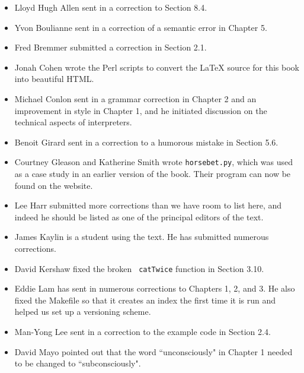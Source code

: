 \begin{itemize}

\small
\item Lloyd Hugh Allen sent in a correction to Section 8.4.

\item Yvon Boulianne sent in a correction of a semantic error in
Chapter 5.

\item Fred Bremmer submitted a correction in Section 2.1.

\item Jonah Cohen wrote the Perl scripts to convert the
LaTeX source for this book into beautiful HTML.

\item Michael Conlon sent in a grammar correction in Chapter 2
and an improvement in style in Chapter 1, and he initiated discussion
on the technical aspects of interpreters.

\item Benoit Girard sent in a
correction to a humorous mistake in Section 5.6.

\item Courtney Gleason and Katherine Smith wrote \texttt{horsebet.py},
which was used as a case study in an earlier version of the book.  Their
program can now be found on the website.

\item Lee Harr submitted more corrections than we have room to list
here, and indeed he should be listed as one of the principal editors
of the text.

\item James Kaylin is a student using the text. He has submitted
numerous corrections.

\item David Kershaw fixed the broken \texttt{ catTwice} function in Section
3.10.

\item Eddie Lam has sent in numerous corrections to Chapters 
1, 2, and 3.
He also fixed the Makefile so that it creates an index the first time it is
run and helped us set up a versioning scheme.  

\item Man-Yong Lee sent in a correction to the example code in
Section 2.4.  

\item David Mayo pointed out that the word ``unconsciously"
in Chapter 1 needed
to be changed to ``subconsciously".


\end{itemize}
